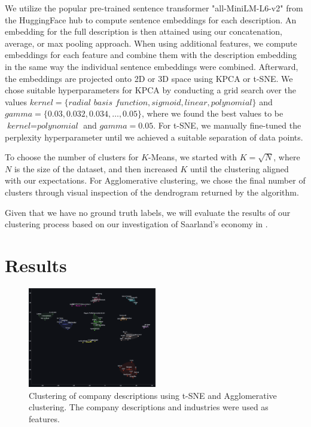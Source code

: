\documentclass[conference]{IEEEtran}
\begin{document}
We utilize the popular pre-trained sentence transformer "all-MiniLM-L6-v2" from the HuggingFace hub to compute sentence embeddings for each description. An embedding for the full description is then attained using our concatenation, average, or max pooling approach. When using additional features, we compute embeddings for each feature and combine them with the description embedding in the same way the individual sentence embeddings were combined.
Afterward, the embeddings are projected onto 2D or 3D space using KPCA or t-SNE. We chose suitable hyperparameters for KPCA by conducting a grid search over the values $\textit{kernel} = \{\textit{radial basis function}, \textit{sigmoid}, \textit{linear}, \textit{polynomial} \}$ and $\textit{gamma} = \{0.03, 0.032, 0.034, \dots, 0.05\}$, where we found the best values to be $\textit{kernel} = \textit{polynomial}$ and $\textit{gamma} = 0.05$. For t-SNE, we manually fine-tuned the perplexity hyperparameter until we achieved a suitable separation of data points.

To choose the number of clusters for $K$-Means, we started with $K = \sqrt{N}$, where $N$ is the size of the dataset, and then increased $K$ until the clustering aligned with our expectations. For Agglomerative clustering, we chose the final number of clusters through visual inspection of the dendrogram returned by the algorithm.

Given that we have no ground truth labels, we will evaluate the results of our clustering process based on our investigation of Saarland's economy in \MakeUppercase{}.

\section{Results}
\begin{figure}[H]
    \centering
    \includegraphics[width=0.5\textwidth]{figures/clustering_results.png}
    \caption{Clustering of company descriptions using t-SNE and Agglomerative clustering. The company descriptions and industries were used as features.}
    \label{fig:t-sne-agglomerative}
\end{figure}
\end{document}
